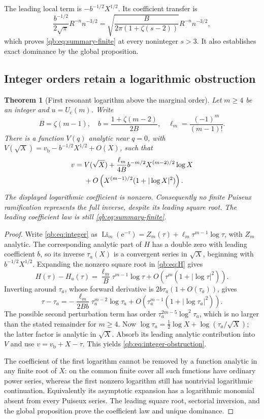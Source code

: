 \documentclass[11pt,a4paper]{article}
\newtheorem{theorem}{Theorem}[section]
\theoremstyle{definition}\newtheorem{definition}[theorem]{Definition}
\theoremstyle{remark}\newtheorem{remark}[theorem]{Remark}
\newcommand{\Li}{\operatorname{Li}}
\newcommand{\ee}{\mathrm e}
\newcommand{\Uc}{U_{\mathrm c}}
\newcommand{\vb}{v_{\mathrm b}}
\numberwithin{equation}{section}
\begin{document}
The leading local term is $-b^{-1/2}X^{1/2}$. Its coefficient transfer is
\[
 \frac{b^{-1/2}}{2\sqrt\pi}R^{-n}n^{-3/2}
 =\sqrt{\frac{B}{2\pi(1+\zeta(s-2))}}R^{-n}n^{-3/2},
\]
which proves \eqref{qb:eq:summary-finite} at every noninteger $s>3$.
It also establishes exact dominance by the global proposition.

\subsection{Integer orders retain a logarithmic obstruction}

\begin{theorem}[First resonant logarithm above the marginal order]
\label{qb:thm:integer-obstruction}
Let $m\ge4$ be an integer and $u=\Uc(m)$. Write
\[
 B=\zeta(m-1),\quad b=\frac{1+\zeta(m-2)}{2B},\quad
 \ell_m=\frac{(-1)^m}{(m-1)!}.
\]
There is a function $V(q)$ analytic near $q=0$, with
$V(\sqrt X)=\vb-b^{-1/2}X^{1/2}+O(X)$, such that
\begin{align}\label{qb:eq:integer-obstruction}
 v={}&V(\sqrt X)+\frac{\ell_m}{4B}b^{-m/2}
       X^{(m-2)/2}\log X\notag\\
 &+O\left(X^{(m-1)/2}(1+|\log X|^2)\right).
\end{align}
The displayed logarithmic coefficient is nonzero. Consequently no finite
Puiseux ramification represents the full inverse, despite its leading
square root. The leading coefficient law is still
\eqref{qb:eq:summary-finite}.
\end{theorem}
\begin{proof}
Write \eqref{qb:eq:integer} as
$\Li_m(\ee^{-\tau})=Z_m(\tau)+\ell_m\tau^{m-1}\log\tau$, with
$Z_m$ analytic. The corresponding analytic part of $H$ has a double zero
with leading coefficient $b$, so its inverse $\tau_a(X)$ is a convergent
series in $\sqrt X$, beginning with $b^{-1/2}X^{1/2}$.
Expanding the nonzero square root in \eqref{qb:eq:H} gives
\[
 H(\tau)-H_a(\tau)=\frac{\ell_m}{B}\tau^{m-1}\log\tau
 +O\left(\tau^m(1+|\log\tau|^2)\right).
\]
Inverting around $\tau_a$, whose forward derivative is
$2b\tau_a(1+O(\tau_a))$, gives
\[
 \tau-\tau_a=-\frac{\ell_m}{2Bb}\tau_a^{m-2}\log\tau_a
 +O\left(\tau_a^{m-1}(1+|\log\tau_a|^2)\right).
\]
The possible second perturbation term has order
$\tau_a^{2m-5}\log^2\tau_a$, which is no larger than the stated
remainder for $m\ge4$. Now
$\log\tau_a=\tfrac12\log X+\log(\tau_a/\sqrt X)$; the latter
factor is analytic in $\sqrt X$. Absorb its leading analytic contribution
into $V$ and use $v=\vb+X-\tau$. This yields
\eqref{qb:eq:integer-obstruction}.

The coefficient of the first logarithm cannot be removed by a function
analytic in any finite root of $X$: on the common finite cover all such
functions have ordinary power series, whereas the first nonzero logarithm
still has nontrivial logarithmic continuation. Equivalently its asymptotic
expansion has a logarithmic monomial absent from every Puiseux series.
The leading square root, sectorial inversion, and the global proposition
prove the coefficient law and unique dominance.
\end{proof}
\end{document}
